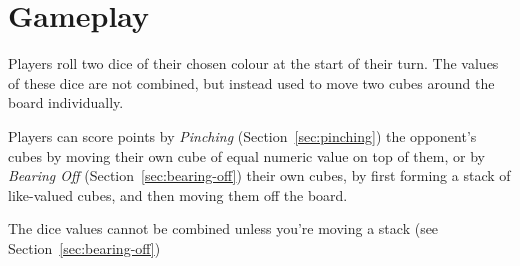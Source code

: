 \section{Gameplay}
Players roll two dice of their chosen colour at the start of their turn.
The values of these dice are not combined, but instead used to move two cubes around the board individually.

Players can score points by \textit{Pinching} (Section~\ref{sec:pinching}) the opponent's cubes by moving their own cube of equal numeric value on top of them, or by \textit{Bearing Off} (Section~\ref{sec:bearing-off}) their own cubes, by first forming a stack of like-valued cubes, and then moving them off the board.

\note The dice values cannot be combined unless you're moving a stack (see Section~\ref{sec:bearing-off})





